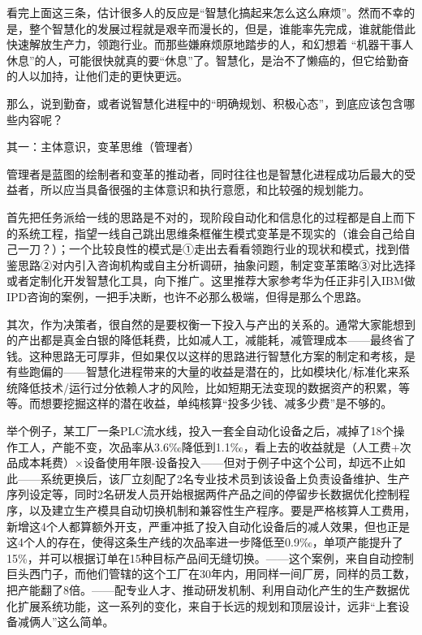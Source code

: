 \documentclass[
]{book}
\begin{document}
看完上面这三条，估计很多人的反应是``智慧化搞起来怎么这么麻烦''。然而不幸的是，整个智慧化的发展过程就是艰辛而漫长的，但是，谁能率先完成，谁就能借此快速解放生产力，领跑行业。而那些嫌麻烦原地踏步的人，和幻想着 ``机器干事人休息''的人，可能很快就真的要``休息''了。智慧化，是治不了懒癌的，但它给勤奋的人以加持，让他们走的更快更远。

那么，说到勤奋，或者说智慧化进程中的``明确规划、积极心态''，到底应该包含哪些内容呢？

其一：主体意识，变革思维（管理者）

管理者是蓝图的绘制者和变革的推动者，同时往往也是智慧化进程成功后最大的受益者，所以应当具备很强的主体意识和执行意愿，和比较强的规划能力。

首先把任务派给一线的思路是不对的，现阶段自动化和信息化的过程都是自上而下的系统工程，指望一线自己跳出思维条框催生模式变革是不现实的（谁会自己给自己一刀？）；一个比较良性的模式是①走出去看看领跑行业的现状和模式，找到借鉴思路②对内引入咨询机构或自主分析调研，抽象问题，制定变革策略③对比选择或者定制化开发智慧化工具，向下推广。这里推荐大家参考华为任正非引入IBM做IPD咨询的案例，一把手决断，也许不必那么极端，但得是那么个思路。

其次，作为决策者，很自然的是要权衡一下投入与产出的关系的。通常大家能想到的产出都是真金白银的降低耗费，比如减人工，减能耗，减管理成本------最终省了钱。这种思路无可厚非，但如果仅以这样的思路进行智慧化方案的制定和考核，是有些跑偏的------智慧化进程带来的大量的收益是潜在的，比如模块化/标准化来系统降低技术/运行过分依赖人才的风险，比如短期无法变现的数据资产的积累，等等。而想要挖掘这样的潜在收益，单纯核算``投多少钱、减多少费''是不够的。

举个例子，某工厂一条PLC流水线，投入一套全自动化设备之后，减掉了18个操作工人，产能不变，次品率从3.6‰降低到1.1‰，看上去的收益就是（人工费+次品成本耗费）×设备使用年限-设备投入------但对于例子中这个公司，却远不止如此------系统更换后，该厂立刻配了2名专业技术员到该设备上负责设备维护、生产序列设定等，同时2名研发人员开始根据两件产品之间的停留步长数据优化控制程序，以及建立生产模具自动切换机制和兼容性生产程序。要是严格核算人工费用，新增这4个人都算额外开支，严重冲抵了投入自动化设备后的减人效果，但也正是这4个人的存在，使得这条生产线的次品率进一步降低至0.9‰，单项产能提升了15\%，并可以根据订单在15种目标产品间无缝切换。------这个案例，来自自动控制巨头西门子，而他们管辖的这个工厂在30年内，用同样一间厂房，同样的员工数，把产能翻了8倍。------配专业人才、推动研发机制、利用自动化产生的生产数据优化扩展系统功能，这一系列的变化，来自于长远的规划和顶层设计，远非``上套设备减俩人''这么简单。
\end{document}
